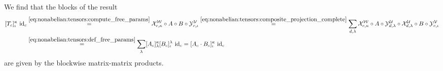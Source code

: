 %
We find that the blocks of the result
\begin{align}
    \label{eq:nonabelian:tensors:tensordot_composition}
    \begin{split}
        [T_c]^\kappa_\iota ~ \mathrm{id}_{c}
        &\overset{\eqref{eq:nonabelian:tensors:compute_free_params}}{=}
        \mathcal{X}^\mathcal{W}_{c,\kappa}
        \circ A \circ B
        \circ \mathcal{Y}^\mathcal{V}_{c,\iota}
        \overset{\eqref{eq:nonabelian:tensors:composite_projection_complete}}{=} \sum_{d,\lambda}
        \mathcal{X}^\mathcal{W}_{c,\kappa}
        \circ A \circ \mathcal{Y}^\mathcal{U}_{d,\lambda}
        \circ \mathcal{X}^\mathcal{U}_{d,\lambda} \circ B
        \circ \mathcal{Y}^\mathcal{V}_{c,\iota}
        \\
        &\overset{\eqref{eq:nonabelian:tensors:def_free_params}}{=}
        \sum_\lambda [A_c]^\kappa_\lambda [B_c]^\lambda_\iota ~ \mathrm{id}_{c}
        = [A_c \cdot B_c]^\kappa_\iota ~ \mathrm{id}_{c}
    \end{split}
\end{align}
are given by the blockwise matrix-matrix products.

